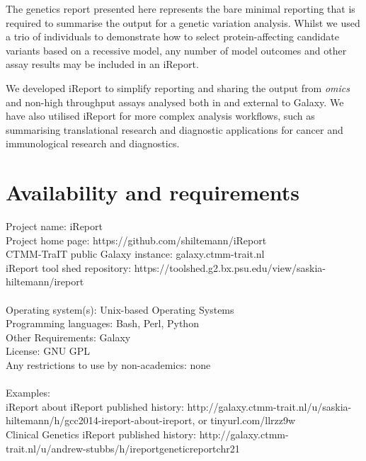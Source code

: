 The genetics report presented here represents the bare minimal reporting that is required to summarise the output for a genetic variation analysis. Whilst we used a trio of individuals to demonstrate how to select protein-affecting candidate variants based on a recessive model, any number of model outcomes and other assay results may be included in an iReport.

We developed iReport to simplify reporting and sharing the output from \emph{omics} and non-high throughput assays analysed both in and external to Galaxy. We have also utilised iReport for more complex analysis workflows, such as summarising translational research and diagnostic applications for cancer and immunological research and diagnostics.

\section*{Availability and requirements}
Project name: iReport \\
Project home page: https://github.com/shiltemann/iReport \\
CTMM-TraIT public Galaxy instance: galaxy.ctmm-trait.nl \\
iReport tool shed repository: https://toolshed.g2.bx.psu.edu/view/saskia-hiltemann/ireport \\
\ \\
Operating system(s): Unix-based Operating Systems \\
Programming languages: Bash, Perl, Python \\
Other Requirements: Galaxy \\
License: GNU GPL \\
Any restrictions to use by non-academics: none \\
\ \\
Examples: \\
iReport about iReport published history: http://galaxy.ctmm-trait.nl/u/saskia-hiltemann/h/gcc2014-ireport-about-ireport, or tinyurl.com/llrzz9w \\
Clinical Genetics iReport published history: http://galaxy.ctmm-trait.nl/u/andrew-stubbs/h/ireportgeneticreportchr21 \\


